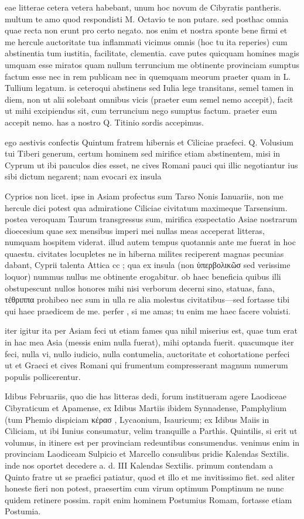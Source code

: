  eae litterae cetera vetera habebant, unum hoc novum de Cibyratis pantheris. multum te amo quod respondisti M. Octavio te non putare. sed posthac omnia quae recta non erunt pro certo negato. nos enim et nostra sponte bene firmi et me hercule auctoritate tua inflammati vicimus omnis (hoc tu ita reperies) cum abstinentia tum iustitia, facilitate, clementia. cave putes quicquam homines magis umquam esse miratos quam nullum terruncium me obtinente provinciam sumptus factum esse nec in rem publicam nec in quemquam meorum praeter quam in L. Tullium legatum. is ceteroqui abstinens sed Iulia lege transitans, semel tamen in diem, non ut alii solebant omnibus vicis (praeter eum semel nemo accepit), facit ut mihi excipiendus sit, cum terruncium nego sumptus factum. praeter eum accepit nemo. has a nostro Q. Titinio sordis accepimus.

 ego aestivis confectis Quintum fratrem hibernis et Ciliciae praefeci. Q. Volusium tui Tiberi generum, certum hominem sed mirifice etiam abstinentem, misi in Cyprum ut ibi pauculos dies esset, ne cives Romani pauci qui illic negotiantur ius sibi dictum negarent; nam evocari ex insula

 Cyprios non licet. ipse in Asiam profectus sum Tarso Nonis Ianuariis, non me hercule dici potest qua admiratione Ciliciae civitatum maximeque Tarsensium. postea veroquam Taurum transgressus sum, mirifica exspectatio Asiae nostrarum dioecesium quae sex mensibus imperi mei nullas meas acceperat litteras, numquam hospitem viderat. illud autem tempus quotannis ante me fuerat in hoc quaestu. civitates locupletes ne in hiberna milites reciperent magnas pecunias dabant, Cyprii talenta Attica cc ; qua ex insula (non ὑπερβολικῶσ sed verissime loquor) nummus nullus me obtinente erogabitur. ob haec beneficia quibus illi obstupescunt nullos honores mihi nisi verborum decerni sino, statuas, fana, τέθριππα prohibeo nec sum in ulla re alia molestus civitatibus—sed fortasse tibi qui haec praedicem de me. perfer , si me amas; tu enim me haec facere voluisti.

 iter igitur ita per Asiam feci ut etiam fames qua nihil miserius est, quae tum erat in hac mea Asia (messis enim nulla fuerat), mihi optanda fuerit. quacumque iter feci, nulla vi, nullo iudicio, nulla contumelia, auctoritate et cohortatione perfeci ut et Graeci et cives Romani qui frumentum compresserant magnum numerum populis pollicerentur.

 Idibus Februariis, quo die has litteras dedi, forum institueram agere Laodiceae Cibyraticum et Apamense, ex Idibus Martiis ibidem Synnadense, Pamphylium (tum Phemio dispiciam κέρασ , Lycaonium, Isauricum; ex Idibus Maiis in Ciliciam, ut ibi Iunius consumatur, velim tranquille a Parthis. Quintilis, si erit ut volumus, in itinere est per provinciam redeuntibus consumendus. venimus enim in provinciam Laodiceam Sulpicio et Marcello consulibus pridie Kalendas Sextilis. inde nos oportet decedere a. d. III Kalendas Sextilis. primum contendam a Quinto fratre ut se praefici patiatur, quod et illo et me invitissimo fiet. sed aliter honeste fieri non potest, praesertim cum virum optimum Pomptinum ne nunc quidem retinere possim. rapit enim hominem Postumius Romam, fortasse etiam Postumia.

